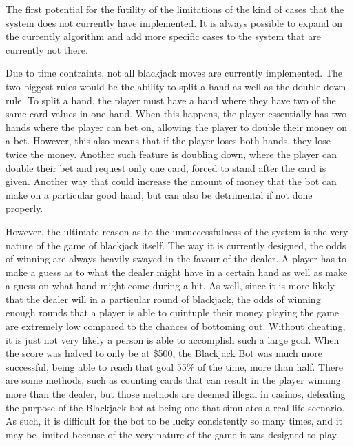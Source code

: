 {{{{{The first potential for the futility of the limitations of the kind of cases that the system does not currently have implemented. It is always possible to expand on the currently algorithm and add more specific cases to the system that are currently not there. 
\newline
{\setlength{\parindent}{0cm}

Due to time contraints, not all blackjack moves are currently implemented. The two biggest rules would be the ability to split a hand as well as the double down rule. To split a hand, the player must have a hand where they have two of the same card values in one hand. When this happens, the player essentially has two hands where the player can bet on, allowing the player to double their money on a bet. However, this also means that if the player loses both hands, they lose twice the money. Another such feature is doubling down, where the player can double their bet and request only one card, forced to stand after the card is given. Another way that could increase the amount of money that the bot can make on a particular good hand, but can also be detrimental if not done properly.
\newline
{\setlength{\parindent}{0cm}

However, the ultimate reason as to the unsuccessfulness of the system is the very nature of the game of blackjack itself. The way it is currently designed, the odds of winning are always heavily swayed in the favour of the dealer. A player has to make a guess as to what the dealer might have in a certain hand as well as make a guess on what hand might come during a hit. As well, since it is more likely that the dealer will in a particular round of blackjack, the odds of winning enough rounds that a player is able to quintuple their money playing the game are extremely low compared to the chances of bottoming out. Without cheating, it is just not very likely a person is able to accomplish such a large goal. When the score was halved to only be at \$500, the Blackjack Bot was much more successful, being able to reach that goal 55\% of the time, more than half. There are some methods, such as counting cards that can result in the player winning more than the dealer, but those methods are deemed illegal in casinos, defeating the purpose of the Blackjack bot at being one that simulates a real life scenario. As such, it is difficult for the bot to be lucky consistently so many times, and it may be limited because of the very nature of the game it was designed to play. 

}}}}}}}
